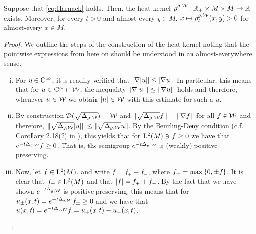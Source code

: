 \documentclass[a4paper, 12pt]{amsart}
\begin{document}
\begin{prop}
\label{prop:MainRed}
Suppose that \eqref{eq:Harnack} holds. Then, the heat
kernel $\rho^{g,\mathcal{W}}_{\cdotp}: \mathbb{R}_{+} \times M \times M \to \mathbb{R}$
exists. Moreover, for every $t > 0$ and almost-every $y \in M$,  $x\mapsto \rho^{g,\mathcal{W}}_t(x,y) > 0$ for almost-every $x \in M$.
\end{prop} 
\begin{proof}
We outline the steps of the construction of the heat kernel
noting that the pointwise expressions from here on should be
understood in an almost-everywhere sense.
\begin{enumerate}[(i)]
\item For $u \in {\rm C}^{\infty}_{\rm {}}$, it is readily verified that 
	$| \nabla |u|| \leq | \nabla u|.$
	In particular, this means that 
	for $u \in {\rm C}^{\infty}_{\rm {}} \cap \mathcal{W}$,
	the inequality
	$\| \nabla |u| \| \leq \| \nabla u \|$ holds
	and therefore, whenever $u \in \mathcal{W}$
	we obtain $|u| \in \mathcal{W}$ 
	with this estimate for such a $u$.

\item 	By construction ${\mathcal{D}}(\sqrt{\Delta_{g, \mathcal{W}}}) = \mathcal{W}$
	and $\| \sqrt{\Delta_{g,\mathcal{W}}} f \| = \| \nabla f \|$
	for all $f \in \mathcal{W}$ and therefore, 
	$\| \sqrt{\Delta_{g, \mathcal{W}}} |u| \| 
		\leq \| \sqrt{\Delta_{g, \mathcal{W}}} u \|$. 
	By the Beurling-Deny condition (c.f.  Corollary 2.18(2) in  \cite{El-Maati}), 
	this yields that for ${\rm L}^{2}_{\rm {}}(M) \ni f \geq 0$
	we have that  $e^{-t \Delta_{g,\mathcal{W}}} f \geq 0$. That is, the semigroup 
	$e^{-t \Delta_{g,\mathcal{W}}}$ is (weakly) positive preserving.

\item Now, let $f \in {\rm L}^{2}_{\rm {}}(M)$, and write
	$f = f_+ - f_-$, where $f_{\pm} = \max\left\{0,\pm f\right\}$.
	It is clear that $f_{\pm} \in {\rm L}^{2}_{\rm {}}(M)$
	and that $|f| = f_+ + f_-$.
	By the fact that we have shown $e^{-t\Delta_{g,\mathcal{W}}}$ 
	is positive preserving, this means that
	for $u_{\pm} (x,t) = e^{-t\Delta_{g,\mathcal{W}}} f_{\pm} \geq 0$	
	and we have that $u(x,t) = e^{-t \Delta_{g,\mathcal{W}}} f = u_+(x,t) - u_-(x,t)$.


\end{enumerate}
\end{proof}
\end{document}
